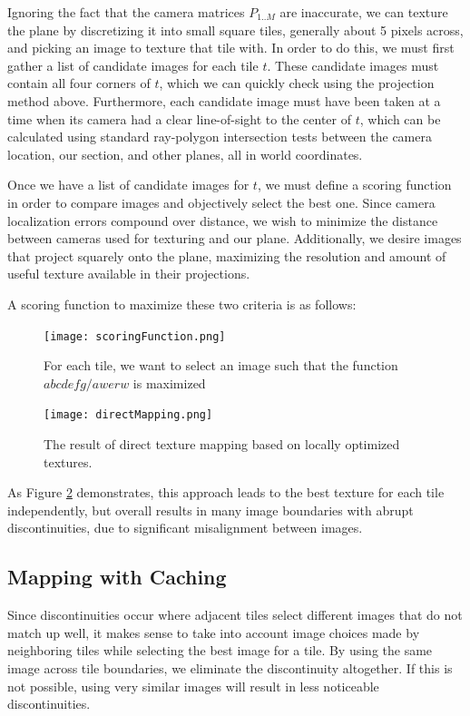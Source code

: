 \documentclass[10pt,twocolumn,letterpaper]{article}
\begin{document}
Ignoring the fact that the camera matrices $P_{1..M}$ are inaccurate,
we can texture the plane by discretizing it into small square
tiles, generally about 5 pixels across, and picking an image to texture that tile with. In order to
do this, we must first gather a list of candidate images for each tile
$t$. These candidate images must contain all four corners of $t$,
which we can quickly check using the projection method
above. Furthermore, each candidate image must have been taken at a
time when its camera had a clear line-of-sight to the center of $t$,
which can be calculated using standard ray-polygon intersection tests
between the camera location, our section, and other planes, all in
world coordinates.

Once we have a list of candidate images for $t$, we must define a
scoring function in order to compare images and objectively select the
best one. Since camera localization errors compound over distance, we
wish to minimize the distance between cameras used for texturing and
our plane. Additionally, we desire images that project squarely onto
the plane, maximizing the resolution and amount of useful texture
available in their projections.

A scoring function to maximize these two criteria is as follows:

\begin{figure}
  \centering
  \texttt{[image: scoringFunction.png]}
  \caption{For each tile, we want to select an image such that the
    function $abcdefg/awerw$ is maximized}
  \label{fig:scoringFunction}
\end{figure}




\begin{figure}
  \centering
  \texttt{[image: directMapping.png]}
  \caption{The result of direct texture mapping based on locally optimized textures.}
  \label{fig:directMapping}
\end{figure}


As Figure \ref{fig:directMapping} demonstrates, this approach leads to
the best texture for each tile independently, but overall results in
many image boundaries with abrupt discontinuities, due to significant
misalignment between images.

\subsection{Mapping with Caching}
Since discontinuities occur where adjacent tiles select different
images that do not match up well, it makes sense to take into account
image choices made by neighboring tiles while selecting the best image
for a tile. By using the same image across tile boundaries, we
eliminate the discontinuity altogether. If this is not possible, using
very similar images will result in less noticeable discontinuities.
\end{document}
